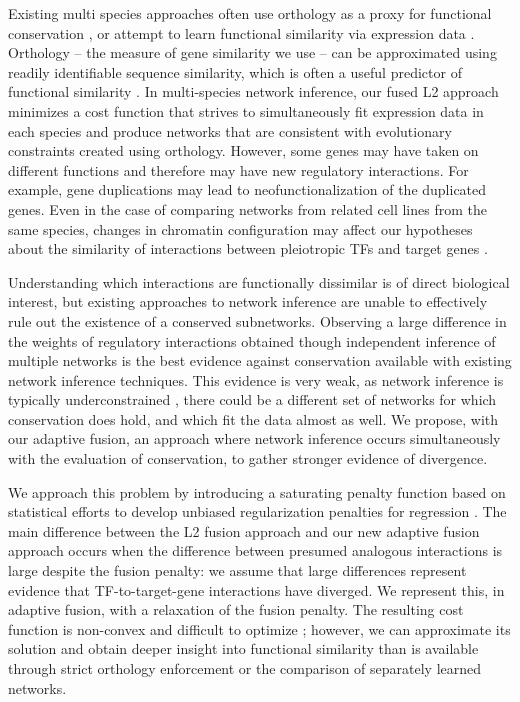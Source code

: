 \documentclass[11pt]{article}
\begin{document}
Existing multi species approaches often use orthology as a proxy for functional conservation \cite{penfold_inferring_2015, joshi_multi-species_2015, kashima_simultaneous_2009, zhang2010nearly}, or attempt to learn functional similarity via expression data \cite{gholami_cross-species_2010}. Orthology -- the measure of gene similarity we use -- can be approximated using readily identifiable sequence similarity, which is often a useful predictor of functional similarity \cite{wilson_assessing_2000}. In multi-species network inference, our fused L2 approach minimizes a cost function that strives to simultaneously fit expression data in each species and produce networks that are consistent with evolutionary constraints created using orthology. However, some genes may have taken on different functions and therefore may have new regulatory interactions. For example, gene duplications may lead to neofunctionalization \cite{eisen_phylogenomics:_1998} of the duplicated genes. Even in the case of comparing networks from related cell lines from the same species, changes in chromatin configuration may affect our hypotheses about the similarity of interactions between pleiotropic TFs and target genes \cite{li_role_2007}.


Understanding which interactions are functionally dissimilar is of direct biological interest, but existing approaches to network inference are unable to effectively rule out the existence of a conserved subnetworks. Observing a large difference in the weights of regulatory interactions obtained though independent inference of multiple networks is the best evidence against conservation available with existing network inference techniques. This evidence is very weak, as network inference is typically underconstrained \cite{marbach_revealing_2010-1}, there could be a different set of networks for which conservation does hold, and which fit the data almost as well. We propose, with our adaptive fusion, an approach where network inference occurs simultaneously with the evaluation of conservation, to gather stronger evidence of divergence. 

We approach this problem by introducing a saturating penalty function based on statistical efforts to develop unbiased regularization penalties for regression \cite{zhang2010nearly, fan2001variable}. The main difference between the L2 fusion approach and our new adaptive fusion approach occurs when the difference between presumed analogous interactions is large despite the fusion penalty: we assume that large differences represent evidence that TF-to-target-gene interactions have diverged. We represent this, in adaptive fusion, with a relaxation of the fusion penalty. The resulting cost function is non-convex and difficult to optimize \cite{fan2001variable}; however, we can approximate its solution and obtain deeper insight into functional similarity than is available through strict orthology enforcement or the comparison of separately learned networks. 
\end{document}
